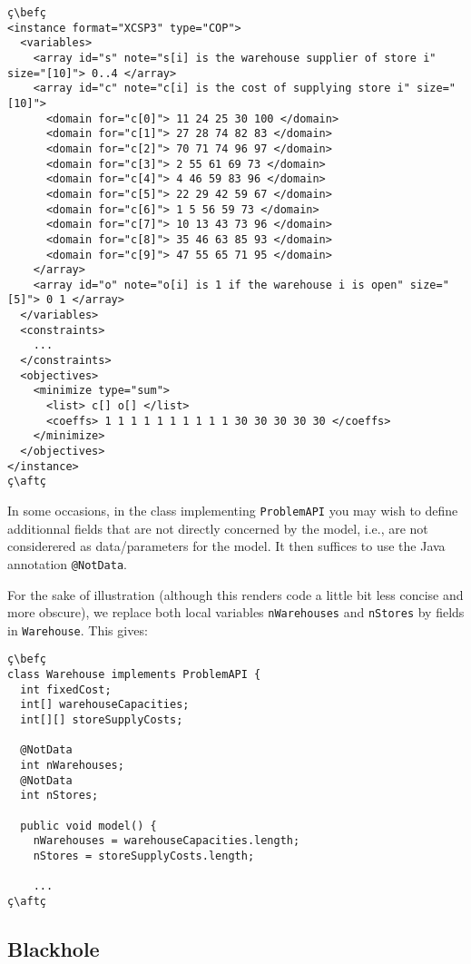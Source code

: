 \documentclass[10pt]{article}
\newcommand{\nn}[1]{{\tt #1}} %
\def\bef{\rule{10cm}{0.1mm}} %
\def\aft{\rule{10cm}{0.1mm}\medskip}
\begin{document}
\begin{lstlisting}
ç\befç
<instance format="XCSP3" type="COP">
  <variables>
    <array id="s" note="s[i] is the warehouse supplier of store i" size="[10]"> 0..4 </array>
    <array id="c" note="c[i] is the cost of supplying store i" size="[10]">
      <domain for="c[0]"> 11 24 25 30 100 </domain>
      <domain for="c[1]"> 27 28 74 82 83 </domain>
      <domain for="c[2]"> 70 71 74 96 97 </domain>
      <domain for="c[3]"> 2 55 61 69 73 </domain>
      <domain for="c[4]"> 4 46 59 83 96 </domain>
      <domain for="c[5]"> 22 29 42 59 67 </domain>
      <domain for="c[6]"> 1 5 56 59 73 </domain>
      <domain for="c[7]"> 10 13 43 73 96 </domain>
      <domain for="c[8]"> 35 46 63 85 93 </domain>
      <domain for="c[9]"> 47 55 65 71 95 </domain>
    </array>
    <array id="o" note="o[i] is 1 if the warehouse i is open" size="[5]"> 0 1 </array>
  </variables>
  <constraints>
    ...
  </constraints>
  <objectives>
    <minimize type="sum">
      <list> c[] o[] </list>
      <coeffs> 1 1 1 1 1 1 1 1 1 1 30 30 30 30 30 </coeffs>
    </minimize>
  </objectives>
</instance>
ç\aftç
\end{lstlisting}


In some occasions, in the class implementing \nn{ProblemAPI} you may wish to define additionnal fields that are not directly concerned by the model, i.e., are not considerered as data/parameters for the model. 
It then suffices to use the Java annotation \nn{@NotData}.

For the sake of illustration (although this renders code a little bit less concise and more obscure), we replace both local variables \texttt{nWarehouses} and \texttt{nStores} by fields in \nn{Warehouse}.
This gives:

\begin{lstlisting}
ç\befç
class Warehouse implements ProblemAPI {
  int fixedCost;
  int[] warehouseCapacities;
  int[][] storeSupplyCosts;

  @NotData
  int nWarehouses;
  @NotData
  int nStores;
  
  public void model() {
    nWarehouses = warehouseCapacities.length;
    nStores = storeSupplyCosts.length;
    
    ... 
ç\aftç
\end{lstlisting}


\subsection{Blackhole}
\end{document}
